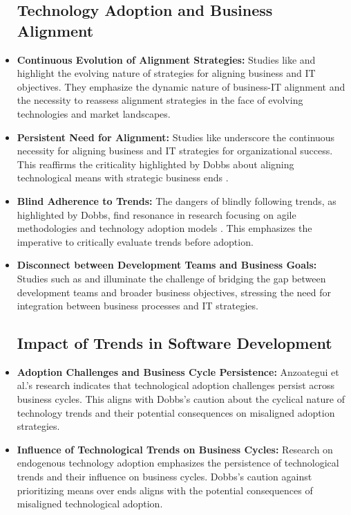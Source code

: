\documentclass[a4Paper]{article}
\begin{document}
\begin{itemize}
    \subsection{Technology Adoption and Business Alignment}
    \item \textbf{Continuous Evolution of Alignment Strategies:} Studies like \cite{ullah2011modeling} and \cite{parthasarthy2018impact} highlight the evolving nature of strategies for aligning business and IT objectives. They emphasize the dynamic nature of business-IT alignment and the necessity to reassess alignment strategies in the face of evolving technologies and market landscapes.
    \item \textbf{Persistent Need for Alignment:} Studies like \cite{ilmudeen2019does} underscore the continuous necessity for aligning business and IT strategies for organizational success. This reaffirms the criticality highlighted by Dobbs about aligning technological means with strategic business ends \cite{al2020impact}.
    \item \textbf{Blind Adherence to Trends:} The dangers of blindly following trends, as highlighted by Dobbs, find resonance in research focusing on agile methodologies \cite{abrahamsson2017agile} and technology adoption models \cite{dube2020review}. This emphasizes the imperative to critically evaluate trends before adoption.
    \item \textbf{Disconnect between Development Teams and Business Goals:} Studies such as \cite{hayat2019influence} and \cite{rahimi2016business} illuminate the challenge of bridging the gap between development teams and broader business objectives, stressing the need for integration between business processes and IT strategies.
    \subsection{Impact of Trends in Software Development}
    \item \textbf{Adoption Challenges and Business Cycle Persistence:} Anzoategui et al.'s research \cite{anzoategui2019endogenous} indicates that technological adoption challenges persist across business cycles. This aligns with Dobbs's caution about the cyclical nature of technology trends and their potential consequences on misaligned adoption strategies.
    \item \textbf{Influence of Technological Trends on Business Cycles:} Research on endogenous technology adoption \cite{anzoategui2019endogenous} emphasizes the persistence of technological trends and their influence on business cycles. Dobbs's caution against prioritizing means over ends aligns with the potential consequences of misaligned technological adoption.

\end{itemize}
\end{document}
